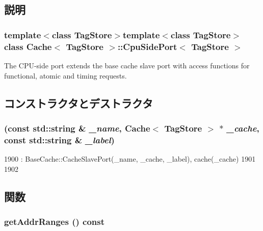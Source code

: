 \subsection{説明}
\subsubsection*{template$<$class TagStore$>$template$<$class TagStore$>$ class Cache$<$ TagStore $>$::CpuSidePort$<$ TagStore $>$}

The CPU-\/side port extends the base cache slave port with access functions for functional, atomic and timing requests. 

\subsection{コンストラクタとデストラクタ}
\hypertarget{classCache_1_1CpuSidePort_a3caee65fa12179ad530ea38fe45bd8be}{
\subsubsection[{CpuSidePort}]{ (const std::string \& {\em \_\-name}, \/  {\bf Cache}$<$ TagStore $>$ $\ast$ {\em \_\-cache}, \/  const std::string \& {\em \_\-label})}}
\label{classCache_1_1CpuSidePort_a3caee65fa12179ad530ea38fe45bd8be}



\begin{DoxyCode}
1900     : BaseCache::CacheSlavePort(_name, _cache, _label), cache(_cache)
1901 {
1902 }
\end{DoxyCode}


\subsection{関数}
\hypertarget{classCache_1_1CpuSidePort_a36cf113d5e5e091ebddb32306c098fae}{
\subsubsection[{getAddrRanges}]{ getAddrRanges () const}}
\label{classCache_1_1CpuSidePort_a36cf113d5e5e091ebddb32306c098fae}



